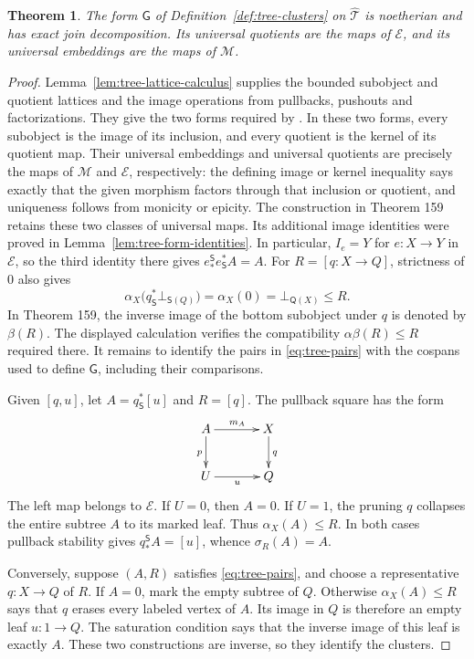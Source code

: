 \documentclass[11pt,a4paper]{article}
\theoremstyle{plain}
\newtheorem{theorem}{Theorem}[section]
\theoremstyle{definition}
\theoremstyle{remark}
\begin{document}
\begin{theorem}\label{thm:tree-cosub}
The form $\mathsf G$ of Definition~\ref{def:tree-clusters} on
$\widehat{\mathcal T}$ is noetherian and has exact join
decomposition. Its universal quotients are the maps of
$\mathcal E$, and its universal embeddings are the maps of
$\mathcal M$.
\end{theorem}
\begin{proof}
Lemma~\ref{lem:tree-lattice-calculus} supplies the bounded
subobject and quotient lattices and the image operations from
pullbacks, pushouts and factorizations. They give the two forms required by
\cite[Theorem 100]{JanelidzeVanNiekerk}. In these two forms,
every subobject is
the image of its inclusion, and every quotient is the kernel
of its quotient map. Their universal embeddings and universal
quotients are precisely the maps of $\mathcal M$ and
$\mathcal E$, respectively: the defining image or kernel
inequality says exactly that the given morphism factors through
that inclusion or quotient, and uniqueness follows from
monicity or epicity. The construction in Theorem 159 retains
these two classes of universal maps. Its additional image
identities were proved in
Lemma~\ref{lem:tree-form-identities}. In particular,
$I_e=Y$ for $e:X\to Y$ in $\mathcal E$, so the third
identity there gives $e_*^{\mathsf S}e_{\mathsf S}^*A=A$.
For $R=[q:X\to Q]$, strictness of $0$ also gives
\[
 \alpha_X\bigl(q_{\mathsf S}^*\bot_{\mathsf S(Q)}\bigr)
 =\alpha_X(0)=\bot_{\mathsf Q(X)}\le R.
\]
In Theorem 159, the inverse image of the bottom subobject under
$q$ is denoted by $\beta(R)$. The displayed calculation verifies
the compatibility $\alpha\beta(R)\le R$ required there.
It remains to identify the pairs in \eqref{eq:tree-pairs} with the cospans used
to define $\mathsf G$, including their comparisons.

Given $[q,u]$, let $A=q_{\mathsf S}^*[u]$ and $R=[q]$.
The pullback square has the form
\[
 \xymatrix@C=3.5em@R=2.3em{
 A\ar[r]^{m_A}\ar[d]_p&X\ar[d]^q\\
 U\ar[r]_u&Q
 }
\]
The left map belongs to $\mathcal E$. If $U=0$, then
$A=0$. If $U=1$, the pruning $q$ collapses the entire
subtree $A$ to its marked leaf. Thus $\alpha_X(A)\le R$.
In both cases pullback stability gives
$q_*^{\mathsf S}A=[u]$, whence $\sigma_R(A)=A$.

Conversely, suppose $(A,R)$ satisfies \eqref{eq:tree-pairs}, and choose a
representative $q:X\to Q$ of $R$. If $A=0$, mark the
empty subtree of $Q$. Otherwise $\alpha_X(A)\le R$ says
that $q$ erases every labeled vertex of $A$. Its image in
$Q$ is therefore an empty leaf $u:1\to Q$. The saturation
condition says that the inverse image of this leaf is exactly
$A$. These two constructions are inverse, so they identify
the clusters.


\end{proof}
\end{document}
